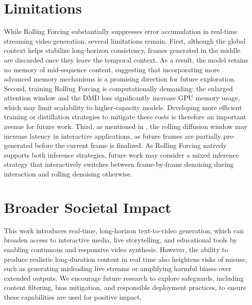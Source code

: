 \section{Limitations}
While Rolling Forcing substantially suppresses error accumulation in real-time streaming video generation, several limitations remain. First, although the global context helps stabilize long-horizon consistency, frames generated in the middle are discarded once they leave the temporal context. As a result, the model retains no memory of mid-sequence content, suggesting that incorporating more advanced memory mechanisms is a promising direction for future exploration. Second, training Rolling Forcing is computationally demanding: the enlarged attention window and the DMD loss significantly increase GPU memory usage, which may limit scalability to higher-capacity models. Developing more efficient training or distillation strategies to mitigate these costs is therefore an important avenue for future work. Third, as mentioned in \citet{huang2025self}, the rolling diffusion window may increase latency in interactive applications, as future frames are partially pre-generated before the current frame is finalized. As Rolling Forcing natively supports both inference strategies, future work may consider a mixed inference strategy that interactively switches between frame-by-frame denoising during interaction and rolling denoising otherwise.



\section{Broader Societal Impact}
This work introduces real-time, long-horizon text-to-video generation, which can broaden access to interactive media, live storytelling, and educational tools by enabling continuous and responsive video synthesis. However, the ability to produce realistic long-duration content in real time also heightens risks of misuse, such as generating misleading live streams or amplifying harmful biases over extended outputs. We encourage future research to explore safeguards, including content filtering, bias mitigation, and responsible deployment practices, to ensure these capabilities are used for positive impact.